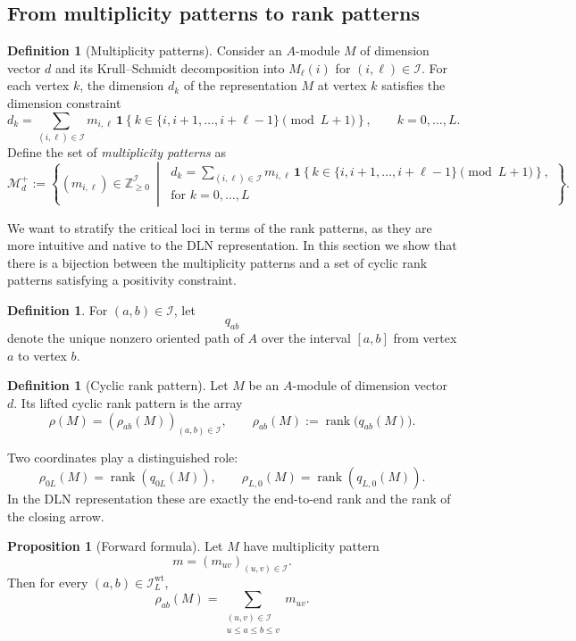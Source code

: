 \documentclass[11pt]{article}
\newcommand{\rk}{\operatorname{rank}}
\theoremstyle{definition}
\newtheorem{proposition}[theorem]{Proposition}
\newtheorem{definition}[theorem]{Definition}
\begin{document}
\subsection{From multiplicity patterns to rank patterns}
\begin{definition}[Multiplicity patterns]
Consider an \(A\)-module \(M\) of dimension vector \(d\) and its Krull--Schmidt decomposition into \(M_{\ell}(i)\) for \((i,\ell)\in \mathcal I\). For each vertex \(k\), the dimension \(d_k\) of the representation \(M\) at vertex \(k\) satisfies the dimension constraint
\[
d_k
=
\sum_{(i,\ell)\in \mathcal I}
m_{i,\ell}\,\mathbf{1}\!\left\{
k \in \{i,i+1,\dots,i+\ell-1\} \pmod{L+1}
\right\},
\qquad k=0,\dots,L.
\]
Define the set of \emph{multiplicity patterns} as
\[
\mathcal M_d^+
:=
\left\{(m_{i,\ell})\in \mathbb{Z}_{\ge 0}^{\mathcal I}
\ \middle|\
\begin{array}{l}
d_k =
\sum_{(i,\ell)\in \mathcal I}
m_{i,\ell}\,\mathbf{1}\!\left\{
k \in \{i,i+1,\dots,i+\ell-1\} \pmod{L+1}
\right\},\\
\text{for } k=0,\dots,L
\end{array}
\right\}.
\]
\end{definition}
We want to stratify the critical loci in terms of the rank patterns, as they are more intuitive and native to the DLN representation. In this section we show that there is a bijection between the multiplicity patterns and a set of cyclic rank patterns satisfying a positivity constraint.
\begin{definition}
For \((a,b)\in \mathcal I\), let
\[
q_{ab}
\]
denote the unique nonzero oriented path of \(A\) over the interval \([a,b]\) from vertex \(a\) to vertex \(b\).
\end{definition}

\begin{definition}[Cyclic rank pattern]
Let \(M\) be an \(A\)-module of dimension vector \(d\). Its
lifted cyclic rank pattern is the array
\[
\rho(M)=(\rho_{ab}(M))_{(a,b)\in \mathcal I},
\qquad
\rho_{ab}(M):=\rk\bigl(q_{ab}(M)\bigr).
\]
\end{definition}

Two coordinates play a distinguished role:
\[
\rho_{0L}(M)=\rk(q_{0L}(M)),
\qquad
\rho_{L,0}(M)=\rk(q_{L,0}(M)).
\]
In the DLN representation these are exactly the end-to-end rank and the rank of the
closing arrow.

\begin{proposition}[Forward formula]
\label{prop:forward}
Let \(M\) have multiplicity pattern
\[
m=(m_{uv})_{(u,v)\in \mathcal I}.
\]
Then for every \((a,b)\in \mathcal I_L^{\mathrm{wt}}\),
\[
\rho_{ab}(M)
=
\sum_{\substack{(u,v)\in \mathcal I\\ u\leq a\leq b\leq v}}
m_{uv}.
\]
\end{proposition}
\end{document}
